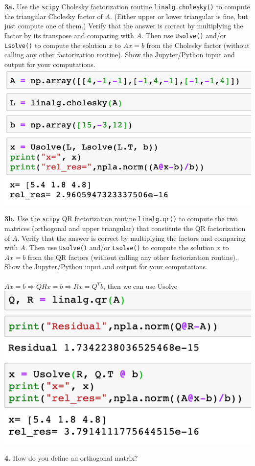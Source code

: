 \documentclass[11pt]{article}
\begin{document}
\par\medskip
{\bf 3a.}
Use the {\tt scipy} Cholesky factorization routine {\tt linalg.cholesky()}
to compute the triangular Cholesky factor of $A$.
(Either upper or lower triangular is fine, but just compute one of them.)
Verify that the answer is correct by multiplying the factor by its transpose and
comparing with $A$.
Then use {\tt Usolve()} and/or {\tt Lsolve()} to compute the solution $x$
to $Ax=b$ from the Cholesky factor (without calling any other factorization routine).
Show the Jupyter/Python input and output for your computations.\\
\includegraphics[scale=0.8]{H4_3a}\\
\par\medskip
{\bf 3b.}
Use the {\tt scipy} QR factorization routine {\tt linalg.qr()}
to compute the two matrices (orthogonal and upper triangular) that
constitute the QR factorization of $A$.
Verify that the answer is correct by multiplying the factors and comparing with $A$.
Then use {\tt Usolve()} and/or {\tt Lsolve()} to compute the solution $x$
to $Ax=b$ from the QR factors (without calling any other factorization routine).
Show the Jupyter/Python input and output for your computations.\\\\
$Ax=b\Rightarrow QRx=b\Rightarrow Rx=Q^Tb$, then we can use Usolve\\
\includegraphics[scale=0.8]{H4_3b.png}\\
\newpage
\par\bigskip
{\bf 4.}
How do you define an orthogonal matrix? 
\end{document}
